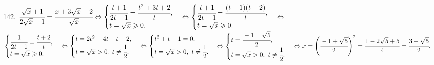 142. $\cfrac{\sqrt{x}+1}{2\sqrt{x}-1}=\cfrac{x+3\sqrt{x}+2}{\sqrt{x}}\Leftrightarrow
\begin{cases}\cfrac{t+1}{2t-1}=\cfrac{t^2+3t+2}{t},\\ t=\sqrt{x}\geqslant0.\end{cases}\Leftrightarrow
\begin{cases}\cfrac{t+1}{2t-1}=\cfrac{(t+1)(t+2)}{t},\\ t=\sqrt{x}\geqslant0.\end{cases}\Leftrightarrow$\\$
\begin{cases}\cfrac{1}{2t-1}=\cfrac{t+2}{t},\\ t=\sqrt{x}\geqslant0.\end{cases}\Leftrightarrow
\begin{cases}t=2t^2+4t-t-2,\\ t=\sqrt{x}>0,\ t\neq\cfrac{1}{2}.\end{cases}\Leftrightarrow
\begin{cases}t^2+t-1=0,\\ t=\sqrt{x}>0,\ t\neq\cfrac{1}{2}.\end{cases}\Leftrightarrow
\begin{cases}t=\cfrac{-1\pm\sqrt{5}}{2},\\ t=\sqrt{x}>0,\ t\neq\cfrac{1}{2}.\end{cases}
\Leftrightarrow x=\left(\cfrac{-1+\sqrt{5}}{2}\right)^2=
\cfrac{1-2\sqrt{5}+5}{4}=\cfrac{3-\sqrt{5}}{2}.$\\
